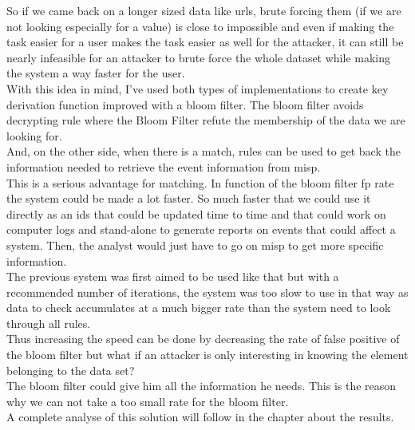 \documentclass{eplmastersthesis}
\begin{document}
So if we came back on a longer sized data like \gls{url}s, brute forcing them (if we are not looking especially for a value) is close to impossible and even if making the task easier for a user makes the task easier as well for the attacker, it can still be nearly infeasible for an attacker to brute force the whole dataset while making the system a way faster for the user.\\

With this idea in mind, I've used both types of implementations to create key derivation function improved with a bloom filter. The bloom filter avoids decrypting rule where the Bloom Filter refute the membership of the data we are looking for. \\
And, on the other side, when there is a match, rules can be used to get back the information needed to retrieve the event information from \gls{misp}.\\

This is a serious advantage for matching. In function of the bloom filter \gls{fp} rate the system could be made a lot faster. So much faster that we could use it directly as an \gls{ids} that could be updated time to time and that could work on computer logs and  stand-alone to generate reports on events that could affect a system. Then, the analyst would just have to go on \gls{misp} to get more specific information.\\
The previous system was first aimed to be used like that but with a recommended number of iterations, the system was too slow to use in that way as data to check accumulates at a much bigger rate than the system need to look through all rules.\\

Thus increasing the speed can be done by decreasing the rate of false positive of the bloom filter but what if an attacker is only interesting in knowing the element belonging to the data set?\\
The bloom filter could give him all the information he needs. This is the reason why we can not take a too small rate for the bloom filter.\\

A complete analyse of this solution will follow in the chapter about the results.
\end{document}
